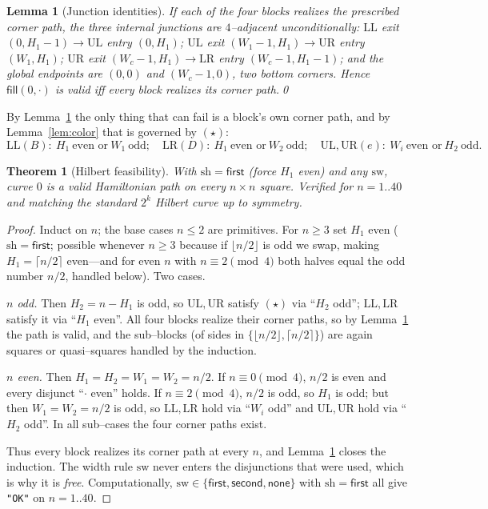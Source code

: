\documentclass[11pt]{article}
\newtheorem{theorem}{Theorem}
\newtheorem{lemma}{Lemma}
\theoremstyle{definition}
\newcommand{\LL}{\mathrm{LL}}
\newcommand{\UL}{\mathrm{UL}}
\newcommand{\UR}{\mathrm{UR}}
\newcommand{\LR}{\mathrm{LR}}
\newcommand{\Fill}{\textsf{fill}}
\begin{document}
\begin{lemma}[Junction identities]\label{lem:junc0}
If each of the four blocks realizes the prescribed corner path, the three internal
junctions are $4$--adjacent \emph{unconditionally}:
$\LL$ exit $(0,H_1\!-\!1)\!\to\!\UL$ entry $(0,H_1)$;
$\UL$ exit $(W_1\!-\!1,H_1)\!\to\!\UR$ entry $(W_1,H_1)$;
$\UR$ exit $(W_c\!-\!1,H_1)\!\to\!\LR$ entry $(W_c\!-\!1,H_1\!-\!1)$;
and the global endpoints are $(0,0)$ and $(W_c\!-\!1,0)$, two bottom corners. Hence
$\Fill(0,\cdot)$ is valid iff every block realizes its corner path.\qed
\end{lemma}

By Lemma~\ref{lem:junc0} the only thing that can fail is a block's own corner path, and by
Lemma~\ref{lem:color} that is governed by $(\star)$:
\[
\LL(B):\ H_1\ \text{even or}\ W_1\ \text{odd};\quad
\LR(D):\ H_1\ \text{even or}\ W_2\ \text{odd};\quad
\UL,\UR(e):\ W_i\ \text{even or}\ H_2\ \text{odd}.
\]

\begin{theorem}[Hilbert feasibility]\label{thm:hilbert}
With $\mathrm{sh}=\textsf{first}$ (force $H_1$ even) and \emph{any} $\mathrm{sw}$, curve $0$
is a valid Hamiltonian path on every $n\times n$ square. Verified for $n=1..40$ and matching
the standard $2^k$ Hilbert curve up to symmetry.
\end{theorem}

\begin{proof}
Induct on $n$; the base cases $n\le 2$ are primitives. For $n\ge 3$ set $H_1$ even
($\mathrm{sh}=\textsf{first}$; possible whenever $n\ge 3$ because if $\lfloor n/2\rfloor$ is
odd we swap, making $H_1=\lceil n/2\rceil$ even---and for even $n$ with $n\equiv 2\pmod 4$
both halves equal the odd number $n/2$, handled below). Two cases.

\emph{$n$ odd.} Then $H_2=n-H_1$ is odd, so $\UL,\UR$ satisfy $(\star)$ via ``$H_2$ odd'';
$\LL,\LR$ satisfy it via ``$H_1$ even''. All four blocks realize their corner paths, so by
Lemma~\ref{lem:junc0} the path is valid, and the sub--blocks (of sides in
$\{\lfloor n/2\rfloor,\lceil n/2\rceil\}$) are again squares or quasi--squares handled by
the induction.

\emph{$n$ even.} Then $H_1=H_2=W_1=W_2=n/2$. If $n\equiv 0\pmod4$, $n/2$ is even and every
disjunct ``$\cdot$ even'' holds. If $n\equiv 2\pmod4$, $n/2$ is odd, so $H_1$ is odd; but
then $W_1=W_2=n/2$ is odd, so $\LL,\LR$ hold via ``$W_i$ odd'' and $\UL,\UR$ hold via
``$H_2$ odd''. In all sub--cases the four corner paths exist.

Thus every block realizes its corner path at every $n$, and Lemma~\ref{lem:junc0} closes the
induction. The width rule $\mathrm{sw}$ never enters the disjunctions that were used, which
is why it is \emph{free}. Computationally, $\mathrm{sw}\in\{\textsf{first},\textsf{second},
\textsf{none}\}$ with $\mathrm{sh}=\textsf{first}$ all give \texttt{"OK"} on $n=1..40$.
\end{proof}
\end{document}
